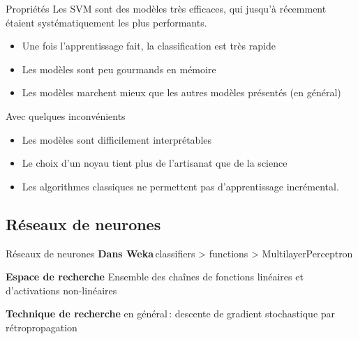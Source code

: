 \documentclass[hyperref={unicode}, xcolor={svgnames}, french]{beamer}
\begin{document}
\begin{frame}{Propriétés}
    Les SVM sont des modèles très efficaces, qui jusqu'à récemment étaient systématiquement les plus performants.
    \begin{itemize}
        \item Une fois l'apprentissage fait, la classification est très rapide
        \item Les modèles sont peu gourmands en mémoire
        \item Les modèles marchent mieux que les autres modèles présentés (en général)
    \end{itemize}
    Avec quelques inconvénients
    \begin{itemize}
        \item Les modèles sont difficilement interprétables
        \item Le choix d'un noyau tient plus de l'artisanat que de la science
        \item Les algorithmes classiques ne permettent pas d'apprentissage incrémental.
    \end{itemize}
\end{frame}



\subsection{Réseaux de neurones}

\begin{frame}{Réseaux de neurones}
    \textbf{Dans Weka} classifiers > functions > MultilayerPerceptron
    \pause

    \textbf{Espace de recherche} Ensemble des chaînes de fonctions linéaires et d'activations non-linéaires
    \pause

    \textbf{Technique de recherche} en général : descente de gradient stochastique par rétropropagation
\end{frame}
\end{document}

